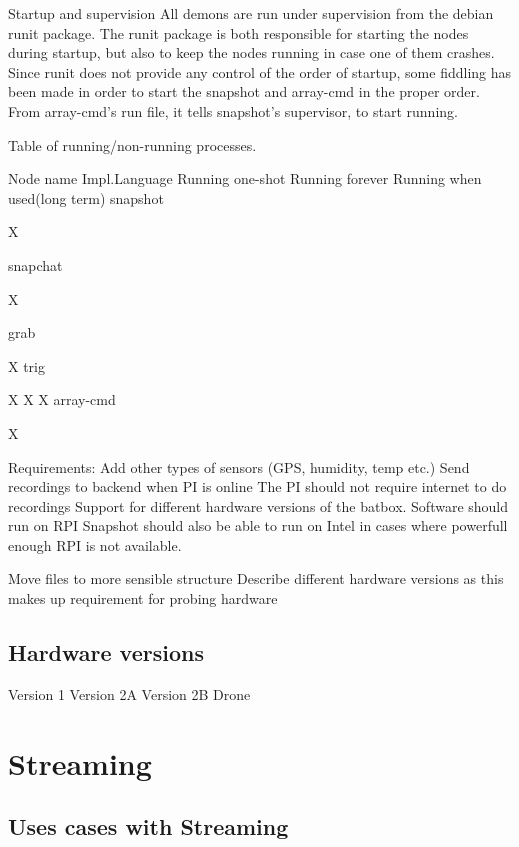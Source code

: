 Startup and supervision
All demons are run under supervision from the debian runit package. The runit package is both responsible for starting the nodes during startup, but also to keep the nodes running in case one of them crashes. Since runit does not provide any control of the order of startup, some fiddling has been made in order to start the snapshot and array-cmd in the proper order. From array-cmd’s run file, it tells snapshot’s supervisor, to start running.

Table of running/non-running processes.


Node name
Impl.Language
Running one-shot
Running forever
Running when used(long term)
snapshot




X


snapchat


X




grab






X
trig


X
X
X
array-cmd




X




Requirements:
Add other types of sensors (GPS, humidity, temp etc.)
Send recordings to backend when PI is online
The PI should not require internet to do recordings
Support for different hardware versions of the batbox.
Software should run on RPI
Snapshot should also be able to run on Intel in cases where powerfull enough RPI is not available.




Move files to more sensible structure
Describe different hardware versions as this makes up requirement for probing hardware

\subsection{Hardware versions}
Version 1
Version 2A
Version 2B
Drone

\section{Streaming}

\subsection{Uses cases with Streaming}


